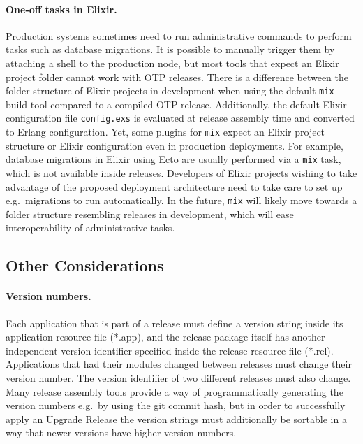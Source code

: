 \paragraph{One-off tasks in Elixir.}
Production systems sometimes need to run administrative commands to perform tasks such as database migrations. It is possible to manually trigger them by attaching a shell to the production node, but most tools that expect an Elixir project folder cannot work with OTP releases. There is a difference between the folder structure of Elixir projects in development when using the default \lstinline|mix| build tool compared to a compiled OTP release. Additionally, the default Elixir configuration file \lstinline|config.exs| is evaluated at release assembly time and converted to Erlang configuration. Yet, some plugins for \lstinline|mix| expect an Elixir project structure or Elixir configuration even in production deployments. For example, database migrations in Elixir using Ecto are usually performed via a \lstinline|mix| task, which is not available inside releases. Developers of Elixir projects wishing to take advantage of the proposed deployment architecture need to take care to set up e.g.~migrations to run automatically. In the future, \lstinline|mix| will likely move towards a folder structure resembling releases in development, which will ease interoperability of administrative tasks.~\cite{mix_releases}


\cleardoublepage
\subsection{Other Considerations}

\paragraph{Version numbers.}
Each application that is part of a release must define a version string inside its application resource file (*.app), and the release package itself has another independent version identifier specified inside the release resource file (*.rel). Applications that had their modules changed between releases must change their version number. The version identifier of two different releases must also change. Many release assembly tools provide a way of programmatically generating the version numbers e.g.~by using the git commit hash, but in order to successfully apply an Upgrade Release the version strings must additionally be sortable in a way that newer versions have higher version numbers.

